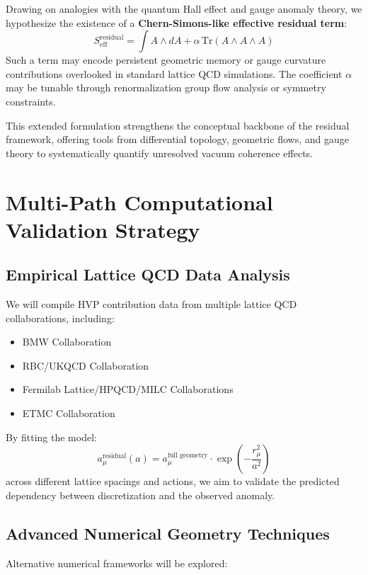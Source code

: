 ﻿\documentclass[12pt]{article}
\theoremstyle{definition}
\theoremstyle{plain}
\begin{document}
Drawing on analogies with the quantum Hall effect and gauge anomaly theory, we hypothesize the existence of a \textbf{Chern-Simons-like effective residual term}:
\[
S_{\mathrm{eff}}^{\mathrm{residual}} = \int A \wedge dA + \alpha\, \mathrm{Tr}(A \wedge A \wedge A)
\]
Such a term may encode persistent geometric memory or gauge curvature contributions overlooked in standard lattice QCD simulations. The coefficient \(\alpha\) may be tunable through renormalization group flow analysis or symmetry constraints.

\noindent This extended formulation strengthens the conceptual backbone of the residual framework, offering tools from differential topology, geometric flows, and gauge theory to systematically quantify unresolved vacuum coherence effects.
\section{Multi-Path Computational Validation Strategy}


\subsection{Empirical Lattice QCD Data Analysis}


We will compile HVP contribution data from multiple lattice QCD collaborations, including:
\begin{itemize}
    \item BMW Collaboration
    \item RBC/UKQCD Collaboration
    \item Fermilab Lattice/HPQCD/MILC Collaborations
    \item ETMC Collaboration
\end{itemize}


By fitting the model:
\begin{equation}
a_\mu^{\text{residual}}(a) = a_\mu^{\text{full geometry}} \cdot \exp\left(-\frac{r_\mu^2}{a^2}\right)
\end{equation}
across different lattice spacings and actions, we aim to validate the predicted dependency between discretization and the observed anomaly.


\subsection{Advanced Numerical Geometry Techniques}


Alternative numerical frameworks will be explored:
\end{document}
